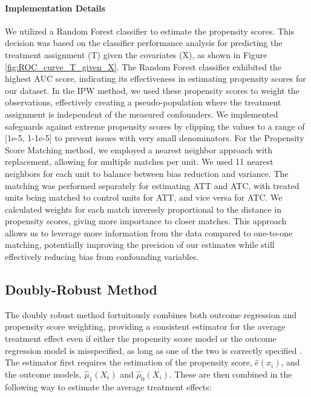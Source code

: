 \documentclass{article}
\newcommand{\gur}[1]{{\color{teal}{Gur: #1}}}
\begin{document}
\gur{Random forest in propensity, Gradient boosting in $Y$}
\paragraph{Implementation Details} We utilized a Random Forest classifier to estimate the propensity scores. This decision was based on the classifier performance analysis for predicting the treatment assignment (T) given the covariates (X), as shown in Figure \ref{fig:ROC_curve_T_given_X}. The Random Forest classifier exhibited the highest AUC score, indicating its effectiveness in estimating propensity scores for our dataset.
In the IPW method, we used these propensity scores to weight the observations, effectively creating a pseudo-population where the treatment assignment is independent of the measured confounders. We implemented safeguards against extreme propensity scores by clipping the values to a range of [1e-5, 1-1e-5] to prevent issues with very small denominators.
For the Propensity Score Matching method, we employed a nearest neighbor approach with replacement, allowing for multiple matches per unit. We used 11 nearest neighbors for each unit to balance between bias reduction and variance. The matching was performed separately for estimating ATT and ATC, with treated units being matched to control units for ATT, and vice versa for ATC. We calculated weights for each match inversely proportional to the distance in propensity scores, giving more importance to closer matches. This approach allows us to leverage more information from the data compared to one-to-one matching, potentially improving the precision of our estimates while still effectively reducing bias from confounding variables.
\gur{Bootstrap}



\subsection{Doubly-Robust Method}

The doubly robust method fortuitously combines both outcome regression and propensity score weighting, providing a consistent estimator for the average treatment effect even if either the propensity score model or the outcome regression model is misspecified, as long as one of the two is correctly specified \citep{bang2005doubly}. The estimator first requires the estimation of the propensity score, $\hat{e}(x_i)$, and the outcome models, $\hat{\mu}_1(X_i)$ and $\hat{\mu}_0(X_i)$. These are then combined in the following way to estimate the average treatment effects:
\end{document}
